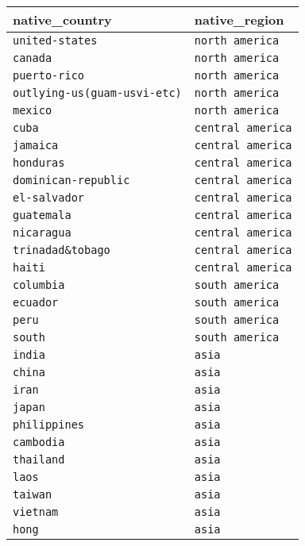 \documentclass[
  letterpaper,
  DIV=11,
  numbers=noendperiod]{scrartcl}
\begin{document}
\begin{longtable}[]{@{}ll@{}}
\toprule\noalign{}
native\_country & native\_region \\
\midrule\noalign{}
\endhead
\bottomrule\noalign{}
\endlastfoot
\texttt{united-states} & \texttt{north\ america} \\
\texttt{canada} & \texttt{north\ america} \\
\texttt{puerto-rico} & \texttt{north\ america} \\
\texttt{outlying-us(guam-usvi-etc)} & \texttt{north\ america} \\
\texttt{mexico} & \texttt{north\ america} \\
\texttt{cuba} & \texttt{central\ america} \\
\texttt{jamaica} & \texttt{central\ america} \\
\texttt{honduras} & \texttt{central\ america} \\
\texttt{dominican-republic} & \texttt{central\ america} \\
\texttt{el-salvador} & \texttt{central\ america} \\
\texttt{guatemala} & \texttt{central\ america} \\
\texttt{nicaragua} & \texttt{central\ america} \\
\texttt{trinadad\&tobago} & \texttt{central\ america} \\
\texttt{haiti} & \texttt{central\ america} \\
\texttt{columbia} & \texttt{south\ america} \\
\texttt{ecuador} & \texttt{south\ america} \\
\texttt{peru} & \texttt{south\ america} \\
\texttt{south} & \texttt{south\ america} \\
\texttt{india} & \texttt{asia} \\
\texttt{china} & \texttt{asia} \\
\texttt{iran} & \texttt{asia} \\
\texttt{japan} & \texttt{asia} \\
\texttt{philippines} & \texttt{asia} \\
\texttt{cambodia} & \texttt{asia} \\
\texttt{thailand} & \texttt{asia} \\
\texttt{laos} & \texttt{asia} \\
\texttt{taiwan} & \texttt{asia} \\
\texttt{vietnam} & \texttt{asia} \\
\texttt{hong} & \texttt{asia} \\

\end{longtable}
\end{document}
